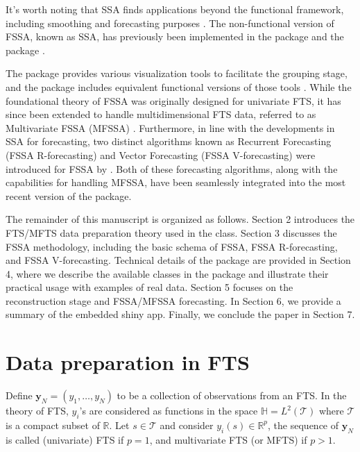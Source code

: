 It's worth noting that SSA finds applications beyond the functional framework, including smoothing and forecasting purposes \citep{hassani2013, deCarvalho2017realtime}. The non-functional version of FSSA, known as SSA, has previously been implemented in the  package \citep{rssapackage} and the  package \citep{ASSApackage}.

The  package provides various visualization tools to facilitate the grouping stage, and the  package includes equivalent functional versions of those tools \citep{golyandina2018singular}. While the foundational theory of FSSA was originally designed for univariate FTS, it has since been extended to handle multidimensional FTS data, referred to as Multivariate FSSA (MFSSA) \citep{trinka2022multivariate}. Furthermore, in line with the developments in SSA for forecasting, two distinct algorithms known as Recurrent Forecasting (FSSA R-forecasting) and Vector Forecasting (FSSA V-forecasting) were introduced for FSSA by \cite{trinka2023functional}. Both of these forecasting algorithms, along with the capabilities for handling MFSSA, have been seamlessly integrated into the most recent version of the  package.

The remainder of this manuscript is organized as follows. Section 2 introduces the FTS/MFTS data preparation theory used in the  class. Section 3 discusses the FSSA methodology, including the basic schema of FSSA, FSSA R-forecasting, and FSSA V-forecasting. Technical details of the  package are provided in Section 4, where we describe the available classes in the package and illustrate their practical usage with examples of real data. Section 5 focuses on the reconstruction stage and FSSA/MFSSA forecasting. In Section 6, we provide a summary of the embedded shiny app. Finally, we conclude the paper in Section 7.

\section{Data preparation in FTS}\label{sec:preparation}

Define $\textbf{y}_N=(y_1,\ldots,y_N)$ to be a collection of observations from an FTS. In the theory of FTS, $y_i$'s are considered as functions in the space $\mathbb{H}=L^2(\mathcal{T})$ where $\mathcal{T}$ is a compact subset of $\mathbb{R}.$ Let $s\in\mathcal{T}$ and consider $y_i(s)\in\mathbb{R}^p$, the sequence of $\textbf{y}_N$ is called (univariate) FTS if $p=1$, and multivariate FTS (or MFTS) if $p>1.$

